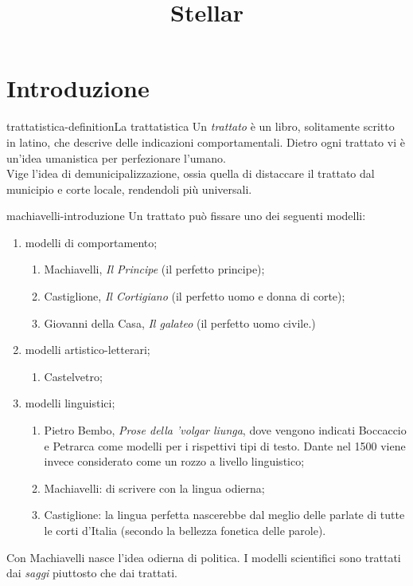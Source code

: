 \documentclass[preview]{standalone}
\begin{document}
\title{Stellar}
\genpage

\section{Introduzione}

\begin{snippetdefinition}{trattatistica-definition}{La trattatistica}
    Un \textit{trattato} è un libro, solitamente scritto in latino,
    che descrive delle indicazioni comportamentali.
    Dietro ogni trattato vi è un'idea umanistica per perfezionare l'umano. \\
    Vige l'idea di demunicipalizzazione, ossia quella di distaccare
    il trattato dal municipio e corte locale, rendendoli più universali.
\end{snippetdefinition}

\begin{snippet}{machiavelli-introduzione}
    Un trattato può fissare uno dei seguenti modelli:
    \begin{enumerate}
        \item modelli di comportamento;
        \begin{enumerate}
            \item Machiavelli, \textit{Il Principe} (il perfetto principe);
            \item Castiglione, \textit{Il Cortigiano} (il perfetto uomo e donna di corte);
            \item Giovanni della Casa, \textit{Il galateo} (il perfetto uomo civile.)
        \end{enumerate}
        \item modelli artistico-letterari;
        \begin{enumerate}
            \item Castelvetro;
        \end{enumerate}
        \item modelli linguistici;
        \begin{enumerate}
            \item Pietro Bembo, \textit{Prose della 'volgar liunga},
                dove vengono indicati Boccaccio e Petrarca come modelli per i rispettivi tipi di testo.
                Dante nel 1500 viene invece considerato come un rozzo a livello linguistico;
            \item Machiavelli: di scrivere con la lingua odierna;
            \item Castiglione: la lingua perfetta nascerebbe dal
                meglio delle parlate di tutte le corti d'Italia (secondo la bellezza fonetica delle parole).
        \end{enumerate}
    \end{enumerate}
    
    Con Machiavelli nasce l'idea odierna di politica.
    I modelli scientifici sono trattati dai \textit{saggi} piuttosto che dai trattati.
\end{snippet}
\end{document}
